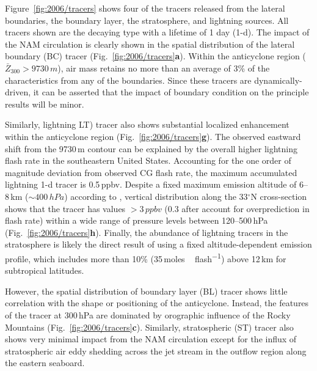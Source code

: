 Figure~\ref{fig:2006/tracers} shows four of the tracers released from the lateral boundaries, the boundary layer, the stratosphere, and
lightning sources. All tracers shown are the decaying type with a lifetime of 1 day (1-d). The impact of the NAM circulation is clearly shown
in the spatial distribution of the lateral boundary (BC) tracer (Fig.~\ref{fig:2006/tracers}{\bf a}). Within the anticyclone region ($\bar{Z}_{300}
>9730\,\unit{m}$), air mass retains no more than an average of 3\% of the characteristics from any of the boundaries. Since these
tracers are dynamically-driven, it can be asserted that the impact of boundary condition on the principle results will be minor.

Similarly, lightning LT) tracer also shows substantial localized enhancement within the anticyclone region (Fig.~\ref{fig:2006/tracers}{\bf g}).
The observed eastward shift from the 9730\,\unit{m} contour can be explained by the overall higher lightning flash rate in the southeastern 
United States. Accounting for the one order of magnitude deviation from observed CG flash rate, the maximum accumulated lightning
1-d tracer is 0.5\,\unit{ppbv}. Despite a fixed maximum emission altitude of 6--8\,\unit{km} ($\sim400\,\unit{hPa}$) according to
\citet{Ott:2010lo}, vertical distribution along the 33$^\circ$N cross-section shows that the tracer has values $>3\,\unit{ppbv}$ (0.3
after account for overprediction in flash rate) within a wide range of pressure levels between 120--500\,\unit{hPa}
(Fig.~\ref{fig:2006/tracers}{\bf h}). Finally, the abundance of lightning tracers in the stratosphere is likely the direct result of using a
fixed altitude-dependent emission profile, which includes more than 10\% (35\,\unit{moles\,flash^{-1}}) above 12\,\unit{km} for
subtropical latitudes.

However, the spatial distribution of boundary layer (BL) tracer shows little correlation with the shape or positioning of the anticyclone. Instead,
the features of the tracer at 300\,\unit{hPa} are dominated by orographic influence of the Rocky Mountains (Fig.~\ref{fig:2006/tracers}{\bf c}).
Similarly, stratospheric (ST) tracer also shows very minimal impact from the NAM circulation except for the influx of stratospheric air eddy
shedding across the jet stream in the outflow region along the eastern seaboard.


